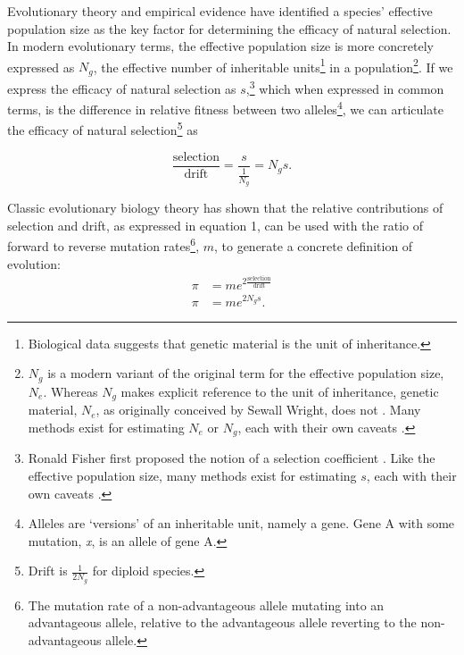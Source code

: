 \documentclass{article}
\begin{document}
Evolutionary theory and empirical evidence have identified a species' effective population size as the key factor for determining the efficacy of natural selection. In modern evolutionary terms, the effective population size is more concretely expressed as $N_g$, the effective number of inheritable units\footnote{Biological data suggests that genetic material is the unit of inheritance.} in a population\footnote{$N_g$ is a modern variant of the original term for the effective population size, $N_e$. Whereas $N_g$ makes explicit reference to the unit of inheritance, genetic material, $N_e$, as originally conceived by Sewall Wright, does not \cite{wright_1931}. Many methods exist for estimating $N_e$ or $N_g$, each with their own caveats \cite{wang_2016}.}. If we express the efficacy of natural selection as $s$,\footnote{Ronald Fisher first proposed the notion of a selection coefficient \cite{fisher_1930}. Like the effective population size, many methods exist for estimating $s$, each with their own caveats \cite{luis-miguel_2011}.} which when expressed in common terms, is the difference in relative fitness between two alleles\footnote{Alleles are `versions' of an inheritable unit, namely a gene. Gene A with some mutation, \textit{x}, is an allele of gene A.}, we can articulate the efficacy of natural selection\footnote{Drift is $\frac{1}{2N_g}$ for diploid species.} as

\begingroup
\large
\begin{equation}
    \frac{\text{selection}}{\text{drift}} = \frac{s}{\frac{1}{N_g}} = N_g s.
\end{equation}
\endgroup

Classic evolutionary biology theory\cite{kimura1983neutral, Lynch_2007} has shown that the relative contributions of selection and drift, as expressed in equation 1, can be used with the ratio of forward to reverse mutation rates\footnote{The mutation rate of a non-advantageous allele mutating into an advantageous allele, relative to the advantageous allele reverting to the non-advantageous allele.}, $m$, to generate a concrete definition of evolution: 
\begingroup
\large
\begin{equation}
\begin{split}
    \pi & = m e^{2 \frac{\text{selection}}{\text{drift}}} \\
    \pi & = m e^{2N_g s}.
\end{split}
\end{equation}
\endgroup
\end{document}
